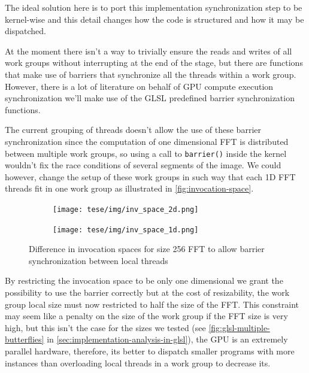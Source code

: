 \documentclass[
  oneside,
  11pt, a4paper,
  footinclude=true,
  headinclude=true,
  cleardoublepage=empty
]{scrbook}
\begin{document}
The ideal solution here is to port this implementation synchronization step to be kernel-wise and this detail changes how the code is structured and how it may be dispatched.


At the moment there isn't a way to trivially ensure the reads and writes of all work groups  \cite{stuart2011efficient} without interrupting at the end of the stage, but there are functions that make use of barriers that synchronize all the threads within a work group. However, there is a lot of literature on behalf of GPU compute execution synchronization we'll make use of the GLSL predefined barrier synchronization functions.

The current grouping of threads doesn't allow the use of these barrier synchronization since the computation of one dimensional FFT is distributed between multiple work groups, so using a call to \texttt{barrier()} inside the kernel wouldn't fix the race conditions of several segments of the image. We could however, change the setup of these work groups in such way that each 1D FFT threads fit in one work group as illustrated in \autoref{fig:invocation-space}. 


\begin{figure}[h] 
    \begin{subfigure}{.5\textwidth}
        \centering
        \texttt{[image: tese/img/inv\_space\_2d.png]}
    \end{subfigure}
    \begin{subfigure}{.5\textwidth}
        \centering
        \texttt{[image: tese/img/inv\_space\_1d.png]}
    \end{subfigure}
    \caption{Difference in invocation spaces for size 256 FFT to allow barrier synchronization between local threads}
    \label{fig:invocation-space}
\end{figure}

By restricting the invocation space to be only one dimensional we grant the possibility to use the barrier correctly but at the cost of resizability, the work group local size must now restricted to half the size of the FFT. This constraint may seem like a penalty on the size of the work group if the FFT size is very high, but this isn't the case for the sizes we tested (see \autoref{fig:glsl-multiple-butterflies} in \autoref{sec:implementation-analysis-in-glsl}), the GPU is an extremely parallel hardware, therefore, its better to dispatch smaller programs with more instances than overloading local threads in a work group to decrease its.
\newline 
\end{document}
